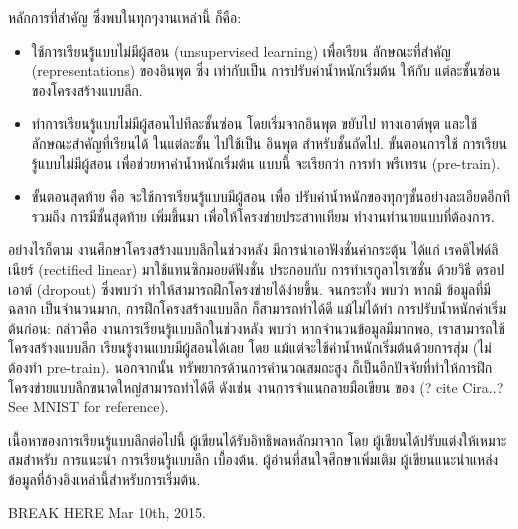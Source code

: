 หลักการที่สำคัญ ซึ่งพบในทุกๆงานเหล่านี้ ก็คือ:
\begin{itemize}
\item ใช้การเรียนรู้แบบไม่มีผู้สอน (unsupervised learning) เพื่อเรียน ลักษณะที่สำคัญ (representations) ของอินพุต ซึ่ง เท่ากับเป็น การปรับค่าน้ำหนักเริ่มต้น ให้กับ แต่ละชั้นซ่อน ของโครงสร้างแบบลึก.
\item ทำการเรียนรู้แบบไม่มีผู้สอนไปทีละชั้นซ่อน โดยเริ่มจากอินพุต ขยับไป ทางเอาต์พุต และใช้ ลักษณะสำคัญที่เรียนได้ ในแต่ละชั้น ไปใช้เป็น อินพุต สำหรับชั้นถัดไป.
ขั้นตอนการใช้ การเรียนรู้แบบไม่มีผู้สอน เพื่อช่วยหาค่าน้ำหนักเริ่มต้น แบบนี้ จะเรียกว่า การทำ พรีเทรน (pre-train).
\item ขั้นตอนสุดท้าย คือ จะใช้การเรียนรู้แบบมีผู้สอน เพื่อ ปรับค่าน้ำหนักของทุกๆชั้นอย่างละเอียดอีกที รวมถึง การมีชั้นสุดท้าย เพิ่มขึ้นมา เพื่อให้โครงข่ายประสาทเทียม ทำงานทำนายแบบที่ต้องการ.
\end{itemize}


อย่างไรก็ตาม งานศึกษาโครงสร้างแบบลึกในช่วงหลัง มีการนำเอาฟังชั่นค่ากระตุ้น ได้แก่ เรคติไฟด์ลิเนียร์ (rectified linear)   มาใช้แทนซิกมอยด์ฟังชั่น ประกอบกับ การทำเรกูลาไรเซชั่น ด้วยวิธี ดรอปเอาต์ (dropout)   ซึ่งพบว่า ทำให้สามารถฝึกโครงข่ายได้ง่ายขึ้น.
จนกระทั่ง พบว่า หากมี ข้อมูลที่มีฉลาก เป็นจำนวนมาก, การฝึกโครงสร้างแบบลึก ก็สามารถทำได้ดี แม้ไม่ได้ทำ การปรับน้ำหนักค่าเริ่มต้นก่อน:
กล่าวคือ งานการเรียนรู้แบบลึกในช่วงหลัง พบว่า หากจำนวนข้อมูลมีมากพอ, เราสามารถใช้ โครงสร้างแบบลึก เรียนรู้งานแบบมีผู้สอนได้เลย โดย แม้แต่จะใช้ค่าน้ำหนักเริ่มต้นด้วยการสุ่ม (ไม่ต้องทำ pre-train).
นอกจากนั้น ทรัพยากรด้านการคำนวณสมถะสูง ก็เป็นอีกปัจจัยที่ทำให้การฝึกโครงข่ายแบบลึกขนาดใหญ่สามารถทำได้ดี ดังเช่น งานการจำแนกลายมือเขียน ของ (? cite Cira..? See MNIST for reference).

เนื้อหาของการเรียนรู้แบบลึกต่อไปนี้ ผู้เขียนได้รับอิทธิพลหลักมาจาก 
\cite{LarochelleEtAl2007a, Larochelle2013a, Hinton2013a, Ng2012a}
โดย ผู้เขียนได้ปรับแต่งให้เหมาะสมสำหรับ การแนะนำ การเรียนรู้แบบลึก เบื้องต้น.
ผู้อ่านที่สนใจศึกษาเพิ่มเติม ผู้เขียนแนะนำแหล่งข้อมูลที่อ้างอิงเหล่านี้สำหรับการเริ่มต้น.

BREAK HERE Mar 10th, 2015.


